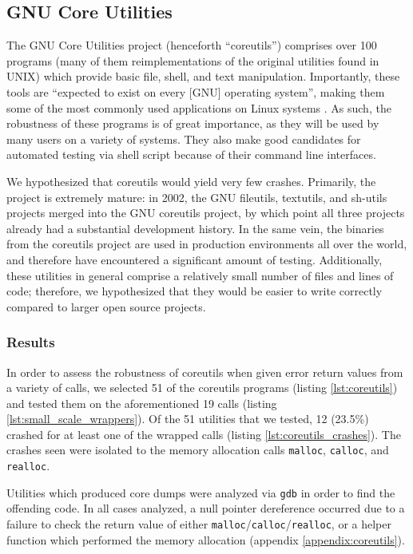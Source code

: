 \subsection{GNU Core Utilities}
The GNU Core Utilities project (henceforth ``coreutils'') comprises over 100 programs (many of them reimplementations of the original utilities found in UNIX) which provide basic file, shell, and text manipulation. Importantly, these tools are ``expected to exist on every [GNU] operating system'', making them some of the most commonly used applications on Linux systems \cite{coreutils}. As such, the robustness of these programs is of great importance, as they will be used by many users on a variety of systems. They also make good candidates for automated testing via shell script because of their command line interfaces.

We hypothesized that coreutils would yield very few crashes. Primarily, the project is extremely mature: in 2002, the GNU fileutils, textutils, and sh-utils projects merged into the GNU coreutils project, by which point all three projects already had a substantial development history. In the same vein, the binaries from the coreutils project are used in production environments all over the world, and therefore have encountered a significant amount of testing. Additionally, these utilities in general comprise a relatively small number of files and lines of code; therefore, we hypothesized that they would be easier to write correctly compared to larger open source projects.

\subsubsection{Results}
In order to assess the robustness of coreutils when given error return values from a variety of calls, we selected 51 of the coreutils programs (listing \ref{lst:coreutils}) and tested them on the aforementioned 19 calls (listing \ref{lst:small_scale_wrappers}). Of the 51 utilities that we tested, 12 (23.5\%) crashed for at least one of the wrapped calls (listing \ref{lst:coreutils_crashes}). The crashes seen were isolated to the memory allocation calls \texttt{malloc}, \texttt{calloc}, and \texttt{realloc}. 

Utilities which produced core dumps were analyzed via \texttt{gdb} in order to find the offending code. In all cases analyzed, a null pointer dereference occurred due to a failure to check the return value of either \texttt{malloc}/\texttt{calloc}/\texttt{realloc}, or a helper function which performed the memory allocation (appendix \ref{appendix:coreutils}).

